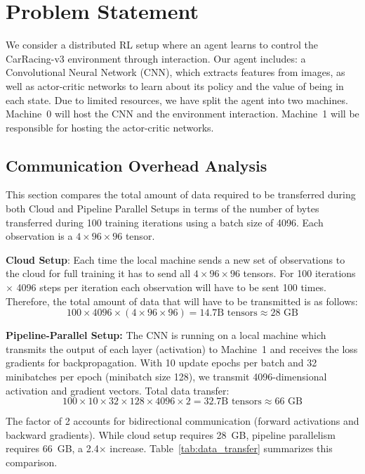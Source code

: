 \chapter{Problem Statement}

We consider a distributed RL setup where an agent learns to control the CarRacing-v3 environment through interaction. Our agent includes: a Convolutional Neural Network (CNN), which extracts features from images, as well as actor-critic networks to learn about its policy and the value of being in each state. Due to limited resources, we have split the agent into two machines. Machine~0 will host the CNN and the environment interaction. Machine~1 will be responsible for hosting the actor-critic networks.

\section{Communication Overhead Analysis}

This section compares the total amount of data required to be transferred during both Cloud and Pipeline Parallel Setups in terms of the number of bytes transferred during 100 training iterations using a batch size of 4096. 
Each observation is a $4 \times 96 \times 96$ tensor.

\textbf{Cloud Setup}: Each time the local machine sends a new set of observations to the cloud for full training it has to send all $4 \times 96 \times 96$ tensors. For 100 iterations $\times$ 4096 steps per iteration each observation will have to be sent 100 times. Therefore, the total amount of data that will have to be transmitted is as follows:
\begin{equation}
100 \times 4096 \times (4 \times 96 \times 96) = 14.7\text{B tensors} \approx 28\text{ GB}
\end{equation}

\textbf{Pipeline-Parallel Setup:} The CNN is running on a local machine which transmits the output of each layer (activation) to Machine~1 and receives the loss gradients for backpropagation. With 10 update epochs per batch and 32 minibatches per epoch (minibatch size 128), we transmit 4096-dimensional activation and gradient vectors. Total data transfer:
\begin{equation}
100 \times 10 \times 32 \times 128 \times 4096 \times 2 = 32.7\text{B tensors} \approx 66\text{ GB}
\end{equation}

The factor of 2 accounts for bidirectional communication (forward activations and backward gradients). While cloud setup requires 28~GB, pipeline parallelism requires 66~GB, a 2.4$\times$ increase. Table~\ref{tab:data_transfer} summarizes this comparison.

